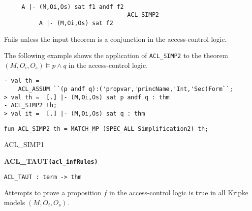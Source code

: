 \DESCRIBE
\begin{verbatim}

     A |- (M,Oi,Os) sat f1 andf f2
     ----------------------------- ACL_SIMP2
          A |- (M,Oi,Os) sat f2
\end{verbatim}

\FAILURE
Fails unless the input theorem is a conjunction in the
access-control logic.

\EXAMPLE The following example shows the application of
\texttt{ACL\_SIMP2} to the theorem $(M,O_i,O_s) \models p \wedge q$ in
the access-control logic.
\begin{holboxed}
\begin{verbatim}
- val th = 
    ACL_ASSUM ``(p andf q):('propvar,'princName,'Int,'Sec)Form``;
> val th =  [.] |- (M,Oi,Os) sat p andf q : thm
- ACL_SIMP2 th;
> val it =  [.] |- (M,Oi,Os) sat q : thm
\end{verbatim}
\end{holboxed}

\IMPLEMENTATION
\begin{holboxed}
\begin{verbatim}
fun ACL_SIMP2 th = MATCH_MP (SPEC_ALL Simplification2) th;
\end{verbatim}
\end{holboxed}

\SEEALSO
ACL\_SIMP1
\ENDDOC

\begin{holboxed}
  \begin{Large}
    \textbf{ACL\_TAUT}\hfill{}\texttt{\textbf{(acl\_infRules)}}  
  \end{Large}
\end{holboxed}

\begin{verbatim}
ACL_TAUT : term -> thm
\end{verbatim}

\SYNOPSIS
Attempts to prove a proposition $f$ in the access-control logic
is true in all Kripke models $(M,O_i,O_s)$.

